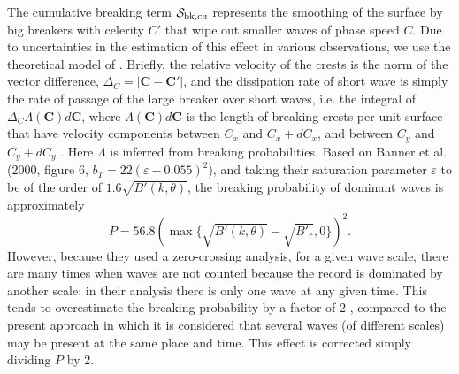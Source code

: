 The cumulative breaking term ${\cal S}_{\mathrm{bk,cu}}$ represents the smoothing
of the surface by big breakers with celerity $C'$ that wipe out smaller waves
of phase speed $C$. Due to uncertainties in the estimation of this effect in
various observations, we use the theoretical model of
\cite{art:Aea09}. Briefly, the relative velocity of the crests is the norm of
the vector difference, $\Delta_C =\left|\mathbf{C}-\mathbf{C}'\right|$, and
the dissipation rate of short wave is simply the rate of passage of the large
breaker over short waves, i.e. the integral of $\Delta_C \Lambda(\mathbf{C})
d\mathbf{C}$, where $\Lambda (\mathbf{C}) d\mathbf{C}$ is the length of
breaking crests per unit surface that have velocity components between $C_x$
and $C_x+dC_x$, and between $C_y$ and $C_y+dC_y$ \citep{art:Phi85}.  Here
$\Lambda$ is inferred from breaking probabilities. Based on Banner et
al. (2000, figure 6, $b_T=22
\left(\varepsilon-0.055\right)^2$)\nocite{art:BBY00}, and taking their
saturation parameter $\varepsilon$ to be of the order of $1.6
\sqrt{B'(k,\theta)}$, the breaking probability of dominant waves is
approximately
\begin{equation}
P=56.8\left(\max\{\sqrt{B'(k,\theta)}-\sqrt{B'_r},0\}\right)^2.\label{PBanner}
\end{equation}
However, because they used a zero-crossing analysis, for a given wave scale,
there are many times when waves are not counted because the record is
dominated by another scale: in their analysis there is only one wave at any
given time.  This tends to overestimate the breaking probability by a factor
of 2 \citep{art:FAB10}, compared to the present approach in which it is 
considered that several waves (of different scales) may be present at the same place and
time. This effect is corrected simply dividing $P$ by 2.

